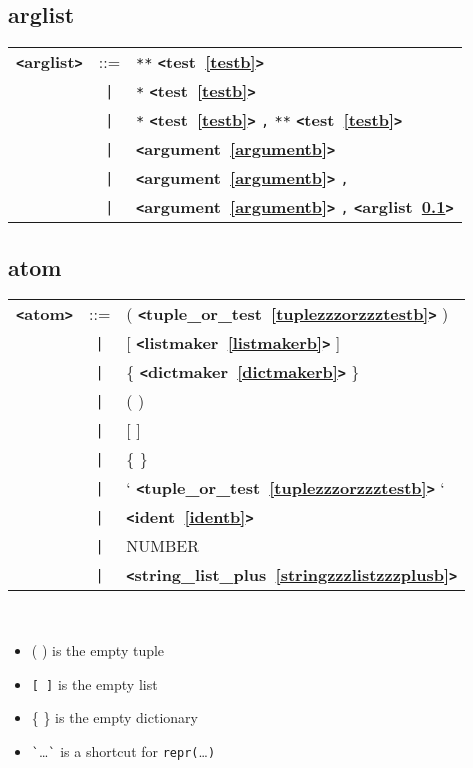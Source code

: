 \documentclass[12pt]{article}
\begin{document}
\subsection{arglist}
\label{arglistb}
\begin{tabular}{lcl}
{\bf \verb+<+arglist\verb+>+} & ::=  & \verb|**| {\bf \verb+<+test~\ref{testb}\verb+>+}  \\
 & \verb+|+  & \verb|*| {\bf \verb+<+test~\ref{testb}\verb+>+}  \\
 & \verb+|+  & \verb|*| {\bf \verb+<+test~\ref{testb}\verb+>+}  \verb|,| \verb|**| {\bf \verb+<+test~\ref{testb}\verb+>+}  \\
 & \verb+|+  & {\bf \verb+<+argument~\ref{argumentb}\verb+>+}  \\
 & \verb+|+  & {\bf \verb+<+argument~\ref{argumentb}\verb+>+}  \verb|,| \\
 & \verb+|+  & {\bf \verb+<+argument~\ref{argumentb}\verb+>+}  \verb|,| {\bf \verb+<+arglist~\ref{arglistb}\verb+>+}  \\
\end{tabular}

\subsection{atom}
\label{atomb}
\begin{tabular}{lcl}
{\bf \verb+<+atom\verb+>+} & ::=  & ( {\bf \verb+<+tuple\_or\_test~\ref{tuplezzzorzzztestb}\verb+>+}  ) \\
 & \verb+|+  & [ {\bf \verb+<+listmaker~\ref{listmakerb}\verb+>+}  ] \\
 & \verb+|+  & \{ {\bf \verb+<+dictmaker~\ref{dictmakerb}\verb+>+}  \} \\
 & \verb+|+  & ( ) \\
 & \verb+|+  & [ ] \\
 & \verb+|+  & \{ \} \\
 & \verb+|+  & ` {\bf \verb+<+tuple\_or\_test~\ref{tuplezzzorzzztestb}\verb+>+}  ` \\
 & \verb+|+  & {\bf \verb+<+ident~\ref{identb}\verb+>+}  \\
 & \verb+|+  & NUMBER \\
 & \verb+|+  & {\bf \verb+<+string\_list\_plus~\ref{stringzzzlistzzzplusb}\verb+>+}  \\
\end{tabular} \\

\begin{itemize}
\item ( ) is the empty tuple
\item \verb|[ ]| is the empty list
\item \{ \} is the empty dictionary
\item \verb|`|\ldots\verb|`| is a shortcut for \verb|repr(|\ldots\verb|)|
\end{itemize}
\end{document}
